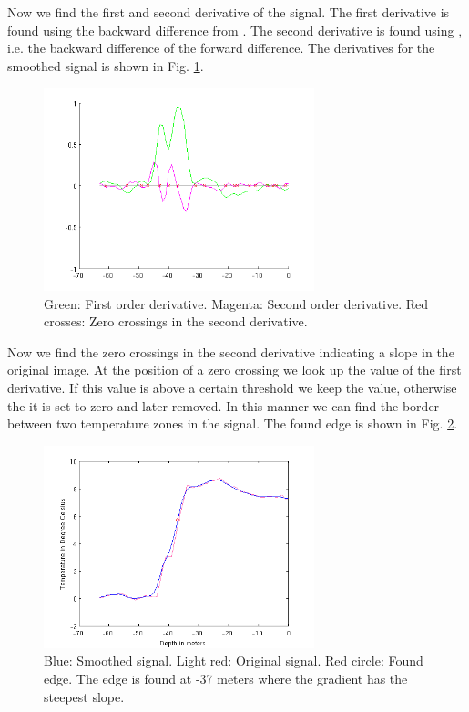 \documentclass[a4paper, 10pt, final]{article}
\begin{document}
Now we find the first and second derivative of the signal. The first
derivative is found using the backward difference from \citep[Eq.
(12.29)]{jahne-digital}. The second derivative is found using
\citep[Eq. (12.44)]{jahne-digital}, i.e. the backward difference of the
forward difference. The derivatives for the smoothed signal is shown in
Fig. \ref{derivatives}.

\begin{figure}[!h]
    \centering
    \includegraphics[angle=0,width=0.7\textwidth]{images/derivatives}
    \caption[]{Green: First order derivative. Magenta: Second order
    derivative. Red crosses: Zero crossings in the second derivative.}
    \label{derivatives}
\end{figure}

Now we find the zero crossings in the second derivative indicating a
slope in the original image. At the position of a zero crossing we look
up the value of the first derivative. If this value is above a certain
threshold we keep the value, otherwise the it is set to zero and later
removed. In this manner we can find the border between two temperature
zones in the signal. The found edge is shown in Fig.
\ref{signal_org_blur_edge}.

\begin{figure}[!h]
    \centering
    \includegraphics[angle=0,width=0.7\textwidth]{images/signal_org_blur_edge}
    \caption[]{Blue: Smoothed signal. Light red: Original signal. Red
    circle: Found edge. The edge is found at -37 meters where the
    gradient has the steepest slope.}
    \label{signal_org_blur_edge}
\end{figure}
\end{document}
